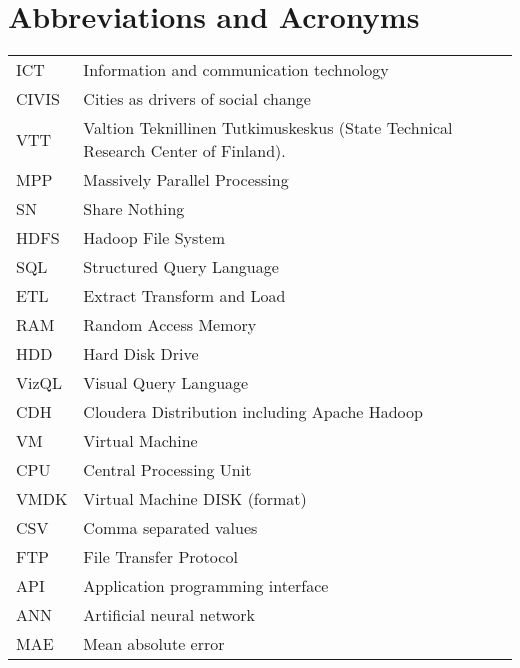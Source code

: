 \chapter*{Abbreviations and Acronyms}


\noindent
\begin{longtable}{@{}p{}p{}@{}}
ICT & Information and communication technology \\
CIVIS & Cities as drivers of social change \\ 
VTT & Valtion Teknillinen Tutkimuskeskus (State Technical Research Center of Finland). \\ 
MPP  & Massively Parallel Processing \\
SN & Share Nothing \\ 
HDFS & Hadoop File System\\
SQL & Structured Query Language\\
ETL & Extract Transform and Load\\
RAM & Random Access Memory\\
HDD & Hard Disk Drive\\
VizQL & Visual Query Language\\
CDH & Cloudera Distribution including Apache Hadoop\\
VM & Virtual Machine\\
CPU & Central Processing Unit\\
VMDK & Virtual Machine DISK (format)\\
CSV & Comma separated values\\
FTP & File Transfer Protocol\\
API & Application programming interface\\
ANN & Artificial neural network\\
MAE & Mean absolute error\\
\end{longtable}
